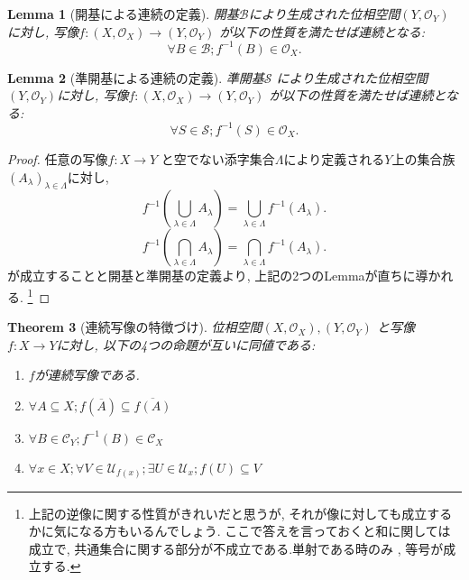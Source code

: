 \documentclass[lualatex]{ltjsbook}
\newcommand{\cl}[1]{\overline{ #1}  }
\newtheorem{theorem}{Theorem}[chapter]
\newtheorem{lemma}[theorem]{Lemma}
\theoremstyle{remark}
\theoremstyle{plain}
\begin{document}
\begin{lemma}[開基による連続の定義]
開基$\mathcal{B}$により生成された位相空間$\left( Y,  \mathcal{O}_Y \right) $に対し, 
写像$f: \left( X ,  \mathcal{O}_X \right) \to \left( Y,  \mathcal{O}_Y \right) $ が以下の性質を満たせば連続となる:
\[
\forall B \in \mathcal{B}; f^{-1}\left( B \right) \in \mathcal{O}_X
.\] 

\end{lemma}

\begin{lemma}[準開基による連続の定義]
	準開基$\mathcal{S}$ により生成された位相空間$\left( Y,  \mathcal{O}_Y \right) $に対し,  写像$f: \left( X ,  \mathcal{O}_X \right) \to \left( Y,  \mathcal{O}_Y \right) $ が以下の性質を満たせば連続となる:
\[
\forall S \in \mathcal{S}; f^{-1}\left( S \right) \in \mathcal{O}_X
.\] 

\end{lemma}

\begin{proof}
	任意の写像$f: X \to Y$ と空でない添字集合$\Lambda$により定義される$Y$上の集合族 $\left( A_{\lambda} \right) _{\lambda \in \Lambda}$に対し, 
	\[
	f^{-1}\left( \bigcup_{\lambda \in \Lambda} A_{\lambda}  \right) = \bigcup_{\lambda \in \Lambda} f^{-1}\left( A_\lambda \right) 
	.\] 
	\[
	f^{-1}\left( \bigcap_{\lambda \in \Lambda} A_{\lambda}  \right) = \bigcap_{\lambda \in \Lambda} f^{-1}\left( A_\lambda \right) 
	.\]
	が成立することと開基と準開基の定義より,  上記の2つのLemmaが直ちに導かれる. 
	\footnote{上記の逆像に関する性質がきれいだと思うが,  それが像に対しても成立するかに気になる方もいるんでしょう. 
	ここで答えを言っておくと和に関しては成立で,  共通集合に関する部分が{\color{red}不成立}である.単射である時のみ ,  等号が成立する.}
\end{proof}


\begin{theorem}[連続写像の特徴づけ]
	位相空間$\left( X, \mathcal{O}_X \right) , \left( Y, \mathcal{O}_Y \right) $ と写像$f:X \to Y$に対し,  以下の4つの命題が互いに同値である:
	\begin{enumerate}
		\item $f$が連続写像である.
		\item  $\forall A \subseteq X ; f\left( \cl{A} \right) \subseteq \cl{f\left( A \right) }$ 
		\item $\forall B \in \mathcal{C}_Y; f^{-1}\left( B \right)  \in \mathcal{C}_X$ 
		\item $\forall x \in X; \forall V \in \mathcal{U}_{f(x)};\exists U \in \mathcal{U}_x; f(U) \subseteq V $
	\end{enumerate}
\end{theorem}
\end{document}
